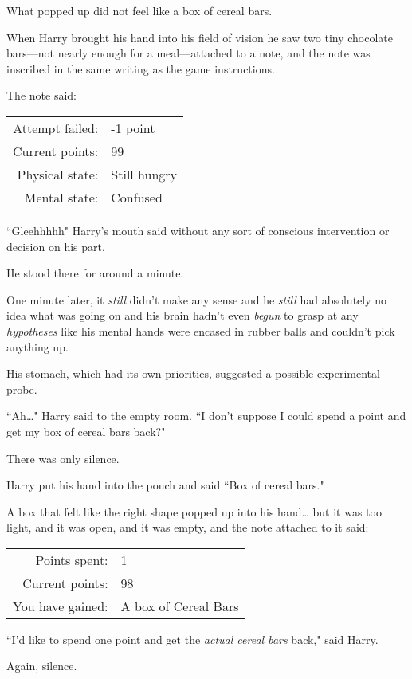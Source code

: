 What popped up did not feel like a box of cereal bars.

When Harry brought his hand into his field of vision he saw two tiny chocolate bars—not nearly enough for a meal—attached to a note, and the note was inscribed in the same writing as the game instructions.

The note said:
\begin{writtenNote}
\begin{tabular}{rl}
Attempt failed: & -1 point\\
Current points: & 99\\
Physical state: & Still hungry\\
Mental state: & Confused
\end{tabular}
\end{writtenNote}

``Gleehhhhh" Harry's mouth said without any sort of conscious intervention or decision on his part.

He stood there for around a minute.

One minute later, it \emph{still} didn't make any sense and he \emph{still} had absolutely no idea what was going on and his brain hadn't even \emph{begun} to grasp at any \emph{hypotheses} like his mental hands were encased in rubber balls and couldn't pick anything up.

His stomach, which had its own priorities, suggested a possible experimental probe.

``Ah{\ldots}" Harry said to the empty room. ``I don't suppose I could spend a point and get my box of cereal bars back?"

There was only silence.

Harry put his hand into the pouch and said ``Box of cereal bars."

A box that felt like the right shape popped up into his hand{\ldots} but it was too light, and it was open, and it was empty, and the note attached to it said:
\begin{writtenNote}
\begin{tabular}{rl}
Points spent: & 1\\
Current points: & 98\\
You have gained: & A box of Cereal Bars
\end{tabular}
\end{writtenNote}

``I'd like to spend one point and get the \emph{actual cereal bars} back," said Harry.

Again, silence.

